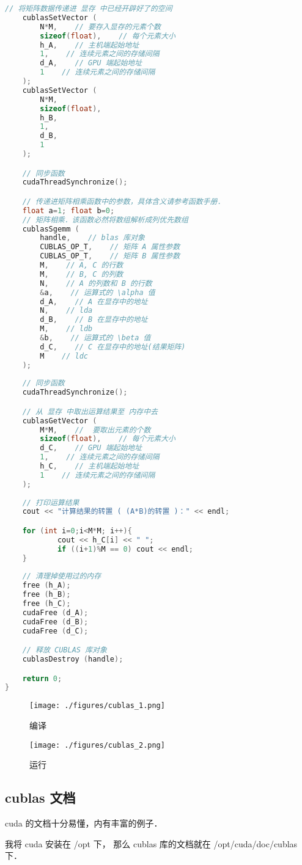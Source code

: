 \begin{lstlisting}[language=cpp]
    // 将矩阵数据传递进 显存 中已经开辟好了的空间
    cublasSetVector (
        N*M,    // 要存入显存的元素个数
        sizeof(float),    // 每个元素大小
        h_A,    // 主机端起始地址
        1,    // 连续元素之间的存储间隔
        d_A,    // GPU 端起始地址
        1    // 连续元素之间的存储间隔
    );
    cublasSetVector (
        N*M, 
        sizeof(float), 
        h_B, 
        1, 
        d_B, 
        1
    );

    // 同步函数
    cudaThreadSynchronize();

    // 传递进矩阵相乘函数中的参数，具体含义请参考函数手册．
    float a=1; float b=0;
    // 矩阵相乘．该函数必然将数组解析成列优先数组
    cublasSgemm (
        handle,    // blas 库对象 
        CUBLAS_OP_T,    // 矩阵 A 属性参数
        CUBLAS_OP_T,    // 矩阵 B 属性参数
        M,    // A, C 的行数 
        M,    // B, C 的列数
        N,    // A 的列数和 B 的行数
        &a,    // 运算式的 \alpha 值
        d_A,    // A 在显存中的地址
        N,    // lda
        d_B,    // B 在显存中的地址
        M,    // ldb
        &b,    // 运算式的 \beta 值
        d_C,    // C 在显存中的地址(结果矩阵)
        M    // ldc
    );
    
    // 同步函数
    cudaThreadSynchronize();

    // 从 显存 中取出运算结果至 内存中去
    cublasGetVector (
        M*M,    //  要取出元素的个数
        sizeof(float),    // 每个元素大小
        d_C,    // GPU 端起始地址
        1,    // 连续元素之间的存储间隔
        h_C,    // 主机端起始地址
        1    // 连续元素之间的存储间隔
    );
    
    // 打印运算结果
    cout << "计算结果的转置 ( (A*B)的转置 )：" << endl;

    for (int i=0;i<M*M; i++){
            cout << h_C[i] << " ";
            if ((i+1)%M == 0) cout << endl;
    }
    
    // 清理掉使用过的内存
    free (h_A);
    free (h_B);
    free (h_C);
    cudaFree (d_A);
    cudaFree (d_B);
    cudaFree (d_C);

    // 释放 CUBLAS 库对象
    cublasDestroy (handle);

    return 0;
}
\end{lstlisting}






\begin{figure}[h]
\centering
\texttt{[image: ./figures/cublas\_1.png]}
\caption{编译} \label{fig:cublas_1}
\end{figure}

\begin{figure}[h]
\centering
\texttt{[image: ./figures/cublas\_2.png]}
\caption{运行} \label{fig:cublas_2}
\end{figure}

\subsection{cublas 文档}%

cuda 的文档十分易懂，内有丰富的例子．

我将 cuda 安装在 /opt 下， 那么 cublas 库的文档就在 /opt/cuda/doc/cublas 下．

